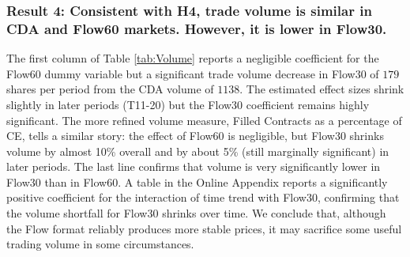 \documentclass[12pt]{article}
\begin{document}
\subsubsection*{Result 4: Consistent with H4, trade volume is similar in CDA and Flow60 markets. However, it is lower in Flow30.}

The first column of Table \ref{tab:Volume} reports a negligible coefficient for the Flow60 dummy variable but a significant trade volume decrease in Flow30 of $179$ shares per period from the CDA volume of $1138$. The estimated effect sizes shrink slightly in later periods (T11-20) 
but the Flow30 coefficient remains highly significant. 
The more refined volume measure, Filled Contracts as a percentage of CE, tells a similar story: the effect of Flow60 is negligible, but Flow30 shrinks volume by almost 10\% overall and by about 5\% (still marginally significant) in later periods. 
The last line confirms that volume is very significantly lower in Flow30 than in Flow60.
A table in the Online Appendix reports a significantly positive coefficient for the interaction of time trend with Flow30,
confirming that the volume shortfall for Flow30 shrinks over time.
We conclude that, although the Flow format reliably produces more stable prices, it may sacrifice some useful trading volume in some circumstances. 

\end{document}
